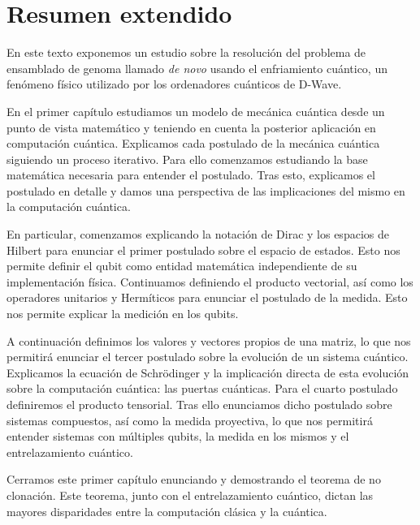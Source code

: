 \chapter*{Resumen extendido}

En este texto exponemos un estudio sobre la resolución del problema de ensamblado de genoma llamado \emph{de novo} usando el enfriamiento cuántico, un fenómeno físico utilizado por los ordenadores cuánticos de D-Wave.

En el primer capítulo estudiamos un modelo de mecánica cuántica desde un punto de vista matemático y teniendo en cuenta la posterior aplicación en computación cuántica. Explicamos cada postulado de la mecánica cuántica siguiendo un proceso iterativo. Para ello comenzamos estudiando la base matemática necesaria para entender el postulado. Tras esto, explicamos el postulado en detalle y damos una perspectiva de las implicaciones del mismo en la computación cuántica.

En particular, comenzamos explicando la notación de Dirac y los espacios de Hilbert para enunciar el primer postulado sobre el espacio de estados. Esto nos permite definir el qubit como entidad matemática independiente de su implementación física. Continuamos definiendo el producto vectorial, así como los operadores unitarios y Hermíticos para enunciar el postulado de la medida. Esto nos permite explicar la medición en los qubits.

A continuación definimos los valores y vectores propios de una matriz, lo que nos permitirá enunciar el tercer postulado sobre la evolución de un sistema cuántico. Explicamos la ecuación de Schrödinger y la implicación directa de esta evolución sobre la computación cuántica: las puertas cuánticas. Para el cuarto postulado definiremos el producto tensorial. Tras ello enunciamos dicho postulado sobre sistemas compuestos, así como la medida proyectiva, lo que nos permitirá entender sistemas con múltiples qubits, la medida en los mismos y el entrelazamiento cuántico.

Cerramos este primer capítulo enunciando y demostrando el teorema de no clonación. Este teorema, junto con el entrelazamiento cuántico, dictan las mayores disparidades entre la computación clásica y la cuántica.

